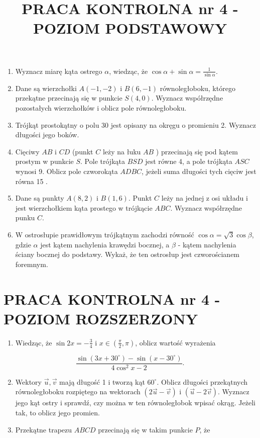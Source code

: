 \documentclass[10pt]{article}
\title{PRACA KONTROLNA nr 4 - POZIOM PODSTAWOWY }
\author{}
\date{}
\begin{document}
\maketitle
\begin{enumerate}
  \item Wyznacz miarę kąta ostrego $\alpha$, wiedząc, że $\cos \alpha+\sin \alpha=\frac{1}{\sin \alpha}$.
  \item Dane są wierzchołki $A(-1,-2)$ i $B(6,-1)$ równoległoboku, którego przekątne przecinają się w punkcie $S(4,0)$. Wyznacz współrzędne pozostałych wierzchołków i oblicz pole równoległoboku.
  \item Trójkąt prostokątny o polu 30 jest opisany na okręgu o promieniu 2. Wyznacz długości jego boków.
  \item Cięciwy $A B$ i $C D$ (punkt $C$ leży na łuku $A B$ ) przecinają się pod kątem prostym w punkcie $S$. Pole trójkąta $B S D$ jest równe 4, a pole trójkąta $A S C$ wynosi 9. Oblicz pole czworokąta $A D B C$, jeżeli suma długości tych cięciw jest równa 15 .
  \item Dane są punkty $A(8,2)$ i $B(1,6)$. Punkt $C$ leży na jednej z osi układu i jest wierzchołkiem kąta prostego w trójkącie $A B C$. Wyznacz współrzędne punku $C$.
  \item W ostrosłupie prawidłowym trójkątnym zachodzi równość $\cos \alpha=\sqrt{3} \cos \beta$, gdzie $\alpha$ jest kątem nachylenia krawędzi bocznej, a $\beta$ - kątem nachylenia ściany bocznej do podstawy. Wykaż, że ten ostrosłup jest czworościanem foremnym.
\end{enumerate}

\section*{PRACA KONTROLNA nr 4 - POZIOM ROZSZERZONY}
\begin{enumerate}
  \item Wiedząc, że $\sin 2 x=-\frac{3}{4}$ i $x \in\left(\frac{\pi}{2}, \pi\right)$, oblicz wartość wyrażenia
\end{enumerate}

$$
\frac{\sin \left(3 x+30^{\circ}\right)-\sin \left(x-30^{\circ}\right)}{4 \cos ^{2} x-2} .
$$

\begin{enumerate}
  \setcounter{enumi}{1}
  \item Wektory $\vec{u}, \vec{v}$ mają długość 1 i tworzą kąt $60^{\circ}$. Oblicz długości przekątnych równoległoboku rozpiętego na wektorach $(2 \vec{u}-\vec{v})$ i $(\vec{u}-2 \vec{v})$. Wyznacz jego kąt ostry i sprawdź, czy można w ten równoległobok wpisać okrąg. Jeżeli tak, to oblicz jego promien.
  \item Przekątne trapezu $A B C D$ przecinają się w takim punkcie $P$, że
\end{enumerate}
\end{document}
